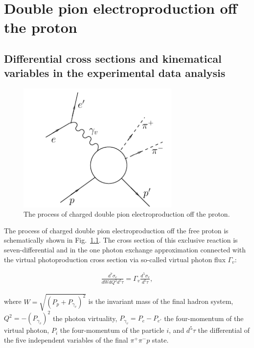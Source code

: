 \chapter{Double pion electroproduction off the proton}
\label{sect:two_pi_prod}
\mbox{}\vspace{-\baselineskip}

\section{Differential cross sections and kinematical variables in the experimental data analysis}
\label{sect:cr_sect_exp}


\begin{figure}[htp]
\begin{center}
\includegraphics[width=8cm]{pictures/2pi_elprod/2pi_el_prod}
\caption{\small The process of charged double pion electroproduction off the proton.} \label{fig:2pi_el_prod_scheme}
\end{center}
\end{figure}

The process of charged double pion electroproduction off the free proton is schematically shown in Fig.~\ref{fig:2pi_el_prod_scheme}. The cross section of this exclusive reaction is seven-differential and in the one photon exchange approximation connected with the virtual photoproduction cross section via so-called virtual photon flux $\Gamma_{v}$:

\begin{align} \label{cr_s_el}
 \frac{d^{7}\sigma_{e} }{dWdQ^2d^{5}\tau} = \Gamma_{v}\frac{d^{5}\sigma_{v} }{d^{5}\tau},
\end{align}

where $W = \sqrt{(P_{p}+P_{\gamma_v})^2}$ is the invariant mass of the final hadron system, $Q^2 = -(P_{\gamma_v})^2$ the photon virtuality, $P_{\gamma_v} = P_{e} - P_{e'}$ the four-momentum of the virtual photon, $P_{i}$ the four-momentum of the particle $i$, and $d^{5}\tau$ the differential of the five independent variables of the final $\pi^+\pi^-p$ state.

